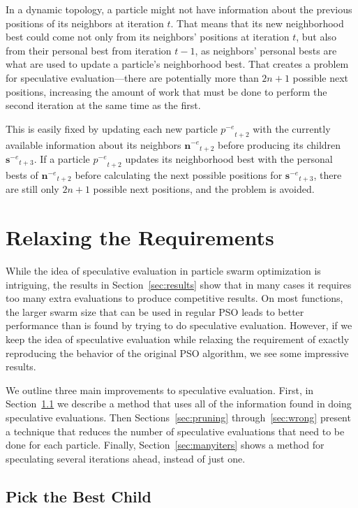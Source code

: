 \documentclass[journal,letterpaper]{IEEEtran}
\renewcommand{\sec}[1]{Section~\ref{sec:#1}}
\providecommand{\noeval}[1]{\ensuremath{#1^{-e}}}
\providecommand{\p}{\ensuremath{p}}
\providecommand{\sset}{\ensuremath{\mathbf{s}}}
\providecommand{\nset}{\ensuremath{\mathbf{n}}}
\begin{document}
In a dynamic topology, a particle might not have information about the previous
positions of its neighbors at iteration $t$.  That means that its new
neighborhood best could come not only from its neighbors' positions at
iteration $t$, but also from their personal best from iteration $t-1$, as
neighbors' personal bests are what are used to update a particle's neighborhood
best.  That creates a problem for speculative evaluation---there are
potentially more than $2n+1$ possible next positions, increasing the amount of
work that must be done to perform the second iteration at the same time as the
first.

This is easily fixed by updating each new particle $\noeval{\p}_{t+2}$ with the
currently available information about its neighbors $\noeval{\nset}_{t+2}$
before producing its children $\noeval{\sset}_{t+3}$.  If a particle
$\noeval{\p}_{t+2}$ updates its neighborhood best with the personal bests of
$\noeval{\nset}_{t+2}$ before calculating the next possible positions for
$\noeval{\sset}_{t+3}$, there are still only $2n+1$ possible next positions,
and the problem is avoided.

\section{Relaxing the Requirements}
\label{sec:relax}

While the idea of speculative evaluation in particle swarm optimization is
intriguing, the results in \sec{results} show that in many cases it requires
too many extra evaluations to produce competitive results.  On most functions,
the larger swarm size that can be used in regular PSO leads to better
performance than is found by trying to do speculative evaluation.  However, if
we keep the idea of speculative evaluation while relaxing the requirement of
exactly reproducing the behavior of the original PSO algorithm, we see some
impressive results.

We outline three main improvements to speculative evaluation.  First, in
\sec{pickbest} we describe a method that uses all of the information found in
doing speculative evaluations.  Then Sections~\ref{sec:pruning}
through~\ref{sec:wrong} present a technique that reduces the number of
speculative evaluations that need to be done for each particle.  Finally,
\sec{manyiters} shows a method for speculating several iterations ahead,
instead of just one.  

\subsection{Pick the Best Child}
\label{sec:pickbest}
\end{document}

